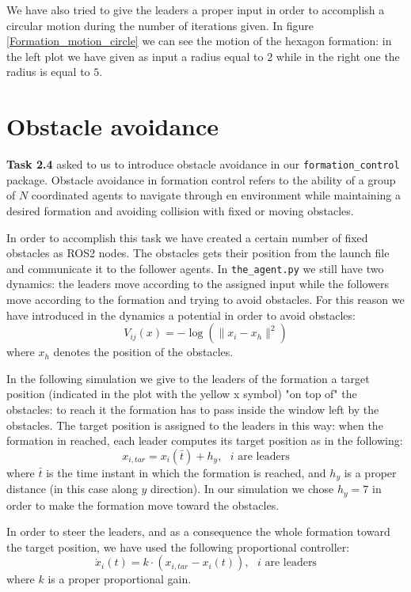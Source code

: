 \documentclass[a4paper,11pt,oneside]{book}
\begin{document}
\bigskip
We have also tried to give the leaders a proper input in order to accomplish a circular motion during the number of iterations given. In figure \ref{Formation_motion_circle} we can see the motion of the hexagon formation: in the left plot we have given as input a radius equal to $2$ while in the right one the radius is equal to $5$.



\section{Obstacle avoidance}
\textbf{Task 2.4} asked to us to introduce obstacle avoidance in our \texttt{formation\_control} package. Obstacle avoidance in formation control refers to the ability of a group of $N$ coordinated agents to navigate through en environment while maintaining a desired formation and avoiding collision with fixed or moving obstacles. 

In order to accomplish this task we have created a certain number of fixed obstacles as ROS2 nodes. The obstacles gets their position from the launch file and communicate it to the follower agents. 
In \texttt{the\_agent.py} we still have two dynamics: the leaders move according to the assigned input while the followers move according to the formation and trying to avoid obstacles. For this reason we have introduced in the dynamics a potential in order to avoid obstacles:
\begin{equation}
V_{ij}(x) = - \log( \lVert x_i - x_h\rVert ^2)
\label{Obstacles_barrier}
\end{equation}
where $x_h$ denotes the position of the obstacles.

\bigskip
In the following simulation we give to the leaders of the formation a target position (indicated in the plot with the yellow x symbol) "on top of" the obstacles: to reach it the formation has to pass inside the window left by the obstacles. 
The target position is assigned to the leaders in this way: when the formation in reached, each leader computes its target position as in the following:
\begin{equation}
x_{i,tar} = x_i(\bar{t}) + h_y, \text{     $i$ are leaders}
\end{equation}
where $\bar{t}$ is the time instant in which the formation is reached, and $h_y$ is a proper distance (in this case along $y$ direction). In our simulation we chose $h_y = 7$ in order to make the formation move toward the obstacles.

\bigskip
In order to steer the leaders, and as a consequence the whole formation toward the target position, we have used the following proportional controller:
\begin{equation}
\dot{x}_i(t) = k\cdot (x_{i,tar} - x_i(t)), \text{     $i$ are leaders}
\end{equation}
where $k$ is a proper proportional gain.
\end{document}
